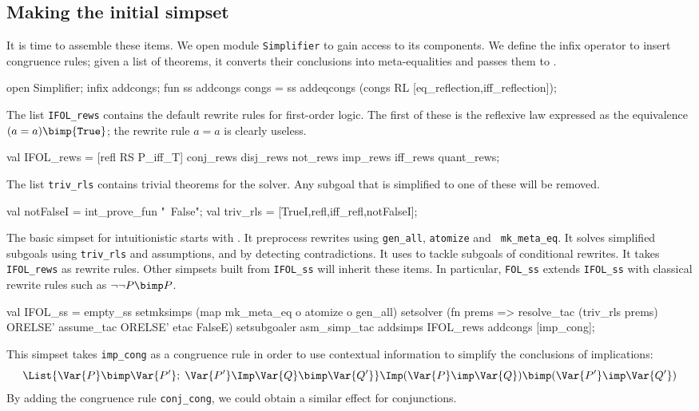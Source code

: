 \subsection{Making the initial simpset}
It is time to assemble these items.  We open module {\tt Simplifier} to
gain access to its components.  We define the infix operator
 to insert congruence rules; given a list of theorems,
it converts their conclusions into meta-equalities and passes them to
.
\begin{ttbox}
open Simplifier;
\ttbreak
infix addcongs;
fun ss addcongs congs =
    ss addeqcongs (congs RL [eq_reflection,iff_reflection]);
\end{ttbox}
The list {\tt IFOL_rews} contains the default rewrite rules for first-order
logic.  The first of these is the reflexive law expressed as the
equivalence $(a=a)\bimp{\tt True}$; the rewrite rule $a=a$ is clearly useless.
\begin{ttbox}
val IFOL_rews =
   [refl RS P_iff_T] \at conj_rews \at disj_rews \at not_rews \at 
    imp_rews \at iff_rews \at quant_rews;
\end{ttbox}
The list {\tt triv_rls} contains trivial theorems for the solver.  Any
subgoal that is simplified to one of these will be removed.
\begin{ttbox}
val notFalseI = int_prove_fun "~False";
val triv_rls = [TrueI,refl,iff_refl,notFalseI];
\end{ttbox}
%
The basic simpset for intuitionistic \FOL{} starts with .
It preprocess rewrites using {\tt gen_all}, {\tt atomize} and {\tt
  mk_meta_eq}.  It solves simplified subgoals using {\tt triv_rls} and
assumptions, and by detecting contradictions.  
It uses  to tackle subgoals of
conditional rewrites.  It takes {\tt IFOL_rews} as rewrite rules.  
Other simpsets built from {\tt IFOL_ss} will inherit these items.
In particular, {\tt FOL_ss} extends {\tt IFOL_ss} with classical rewrite
rules such as $\neg\neg P\bimp P$.
\begin{ttbox}
val IFOL_ss = 
  empty_ss 
  setmksimps (map mk_meta_eq o atomize o gen_all)
  setsolver  (fn prems => resolve_tac (triv_rls \at prems)
                          ORELSE' assume_tac
                          ORELSE' etac FalseE)
  setsubgoaler asm_simp_tac
  addsimps IFOL_rews
  addcongs [imp_cong];
\end{ttbox}
This simpset takes {\tt imp_cong} as a congruence rule in order to use
contextual information to simplify the conclusions of implications:
\[ \List{\Var{P}\bimp\Var{P'};\; \Var{P'} \Imp \Var{Q}\bimp\Var{Q'}} \Imp
   (\Var{P}\imp\Var{Q}) \bimp (\Var{P'}\imp\Var{Q'})
\]
By adding the congruence rule {\tt conj_cong}, we could obtain a similar
effect for conjunctions.


